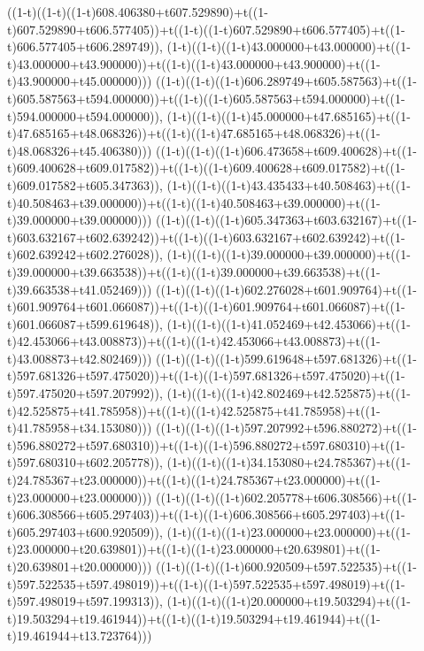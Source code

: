 ((1-t)((1-t)((1-t)608.406380+t607.529890)+t((1-t)607.529890+t606.577405))+t((1-t)((1-t)607.529890+t606.577405)+t((1-t)606.577405+t606.289749)),                                     (1-t)((1-t)((1-t)43.000000+t43.000000)+t((1-t)43.000000+t43.900000))+t((1-t)((1-t)43.000000+t43.900000)+t((1-t)43.900000+t45.000000)))
((1-t)((1-t)((1-t)606.289749+t605.587563)+t((1-t)605.587563+t594.000000))+t((1-t)((1-t)605.587563+t594.000000)+t((1-t)594.000000+t594.000000)),                                     (1-t)((1-t)((1-t)45.000000+t47.685165)+t((1-t)47.685165+t48.068326))+t((1-t)((1-t)47.685165+t48.068326)+t((1-t)48.068326+t45.406380)))
((1-t)((1-t)((1-t)606.473658+t609.400628)+t((1-t)609.400628+t609.017582))+t((1-t)((1-t)609.400628+t609.017582)+t((1-t)609.017582+t605.347363)),                                     (1-t)((1-t)((1-t)43.435433+t40.508463)+t((1-t)40.508463+t39.000000))+t((1-t)((1-t)40.508463+t39.000000)+t((1-t)39.000000+t39.000000)))
((1-t)((1-t)((1-t)605.347363+t603.632167)+t((1-t)603.632167+t602.639242))+t((1-t)((1-t)603.632167+t602.639242)+t((1-t)602.639242+t602.276028)),                                     (1-t)((1-t)((1-t)39.000000+t39.000000)+t((1-t)39.000000+t39.663538))+t((1-t)((1-t)39.000000+t39.663538)+t((1-t)39.663538+t41.052469)))
((1-t)((1-t)((1-t)602.276028+t601.909764)+t((1-t)601.909764+t601.066087))+t((1-t)((1-t)601.909764+t601.066087)+t((1-t)601.066087+t599.619648)),                                     (1-t)((1-t)((1-t)41.052469+t42.453066)+t((1-t)42.453066+t43.008873))+t((1-t)((1-t)42.453066+t43.008873)+t((1-t)43.008873+t42.802469)))
((1-t)((1-t)((1-t)599.619648+t597.681326)+t((1-t)597.681326+t597.475020))+t((1-t)((1-t)597.681326+t597.475020)+t((1-t)597.475020+t597.207992)),                                     (1-t)((1-t)((1-t)42.802469+t42.525875)+t((1-t)42.525875+t41.785958))+t((1-t)((1-t)42.525875+t41.785958)+t((1-t)41.785958+t34.153080)))
((1-t)((1-t)((1-t)597.207992+t596.880272)+t((1-t)596.880272+t597.680310))+t((1-t)((1-t)596.880272+t597.680310)+t((1-t)597.680310+t602.205778)),                                     (1-t)((1-t)((1-t)34.153080+t24.785367)+t((1-t)24.785367+t23.000000))+t((1-t)((1-t)24.785367+t23.000000)+t((1-t)23.000000+t23.000000)))
((1-t)((1-t)((1-t)602.205778+t606.308566)+t((1-t)606.308566+t605.297403))+t((1-t)((1-t)606.308566+t605.297403)+t((1-t)605.297403+t600.920509)),                                     (1-t)((1-t)((1-t)23.000000+t23.000000)+t((1-t)23.000000+t20.639801))+t((1-t)((1-t)23.000000+t20.639801)+t((1-t)20.639801+t20.000000)))
((1-t)((1-t)((1-t)600.920509+t597.522535)+t((1-t)597.522535+t597.498019))+t((1-t)((1-t)597.522535+t597.498019)+t((1-t)597.498019+t597.199313)),                                     (1-t)((1-t)((1-t)20.000000+t19.503294)+t((1-t)19.503294+t19.461944))+t((1-t)((1-t)19.503294+t19.461944)+t((1-t)19.461944+t13.723764)))
